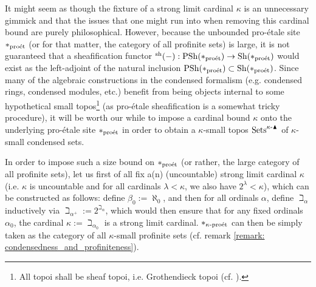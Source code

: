             \begin{remark} \label{remark: condensed_sets_set_theoretic_issues}
                It might seem as though the fixture of a strong limit cardinal $\kappa$ is an unnecessary gimmick and that the issues that one might run into when removing this cardinal bound are purely philosophical. However, because the unbounded pro-\'etale site $*_{\mathrm{pro\acute{e}t}}$ (or for that matter, the category of all profinite sets) is large, it is not guaranteed that a sheafification functor ${}^{\mathrm{sh}}(-): \mathrm{PSh}(*_{\mathrm{pro\acute{e}t}}) \to \mathrm{Sh}(*_{\mathrm{pro\acute{e}t}})$ would exist as the left-adjoint of the natural inclusion $\mathrm{PSh}(*_{\mathrm{pro\acute{e}t}}) \subset \mathrm{Sh}(*_{\mathrm{pro\acute{e}t}})$. Since many of the algebraic constructions in the condensed formalism (e.g. condensed rings, condensed modules, etc.) benefit from being objects internal to some hypothetical small topos\footnote{All topoi shall be sheaf topoi, i.e. Grothendieck topoi (cf. \cite[Expos\'e IV]{sga4}).} (as pro-\'etale sheafification is a somewhat tricky procedure), it will be worth our while to impose a cardinal bound $\kappa$ onto the underlying pro-\'etale site $*_{\mathrm{pro\acute{e}t}}$ in order to obtain a $\kappa$-small topos $\mathrm{Sets}^{\kappa\text{-}\blacktriangle}$ of $\kappa$-small condensed sets.
                
                In order to impose such a size bound on $*_{\mathrm{pro\acute{e}t}}$ (or rather, the large category of all profinite sets), let us first of all fix a(n) (uncountable) strong limit cardinal $\kappa$ (i.e. $\kappa$ is uncountable and for all cardinals $\lambda < \kappa$, we also have $2^{\lambda} < \kappa$), which can be constructed as follows: define $\beta_0 := \aleph_0$, and then for all ordinals $\alpha$, define $\beth_{\alpha}$ inductively via $\beth_{\alpha^+} := 2^{\beth_{\alpha}}$, which would then ensure that for any fixed ordinals $\alpha_0$, the cardinal $\kappa := \beth_{\alpha_0}$ is a strong limit cardinal. $*_{\kappa\text{-}\mathrm{pro\acute{e}t}}$ can then be simply taken as the category of all $\kappa$-small profinite sets (cf. remark \ref{remark: condensedness_and_profiniteness}). 
                

\end{remark}
